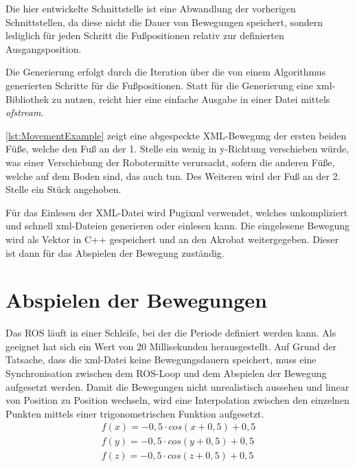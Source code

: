 \begin{itemize}
Die hier entwickelte Schnittstelle ist eine Abwandlung der vorherigen Schnittstellen, da diese nicht die Dauer von Bewegungen speichert, sondern lediglich für jeden Schritt die Fußpositionen relativ zur definierten Ausgangsposition.

Die Generierung erfolgt durch die Iteration über die von einem Algorithmus generierten Schritte für die Fußpositionen. Statt für die Generierung eine xml-Bibliothek zu nutzen, reicht hier eine einfache Ausgabe in einer Datei mittels \emph{ofstream}.

\autoref{lst:MovementExample} zeigt eine abgespeckte XML-Bewegung der ersten beiden Füße, welche den Fuß an der 1. Stelle ein wenig in y-Richtung verschieben würde, was einer Verschiebung der Robotermitte verursacht, sofern die anderen Füße, welche auf dem Boden sind, das auch tun. Des Weiteren wird der Fuß an der 2. Stelle ein Stück angehoben.

Für das Einlesen der XML-Datei wird Pugixml \autocite{pugixml} verwendet, welches unkompliziert und schnell xml-Dateien generieren oder einlesen kann. Die eingelesene Bewegung wird als Vektor in C++ gespeichert und an den Akrobat weitergegeben. Dieser ist dann für das Abspielen der Bewegung zuständig.



\section{Abspielen der Bewegungen}

Das \ac{ROS} läuft in einer Schleife, bei der die Periode definiert werden kann. Als geeignet hat sich ein Wert von 20 Millisekunden herausgestellt. Auf Grund der Tatsache, dass die xml-Datei keine Bewegungsdauern speichert, muss eine Synchronisation zwischen dem \ac{ROS}-Loop und dem Abspielen der Bewegung aufgesetzt werden. Damit die Bewegungen nicht unrealistisch aussehen und linear von Position zu Position wechseln, wird eine Interpolation zwischen den einzelnen Punkten mittels einer trigonometrischen Funktion aufgesetzt.
\begin{eqnarray}
\label{kap4:cosinterpolation}
f(x) = -0,5 \cdot cos(x + 0,5) + 0,5 \\
\label{kap4:cosinterpolation2}
f(y) = -0,5 \cdot cos(y + 0,5) + 0,5 \\
\label{kap4:cosinterpolation3}
f(z) = -0,5 \cdot cos(z + 0,5) + 0,5
\end{eqnarray}


\end{itemize}
